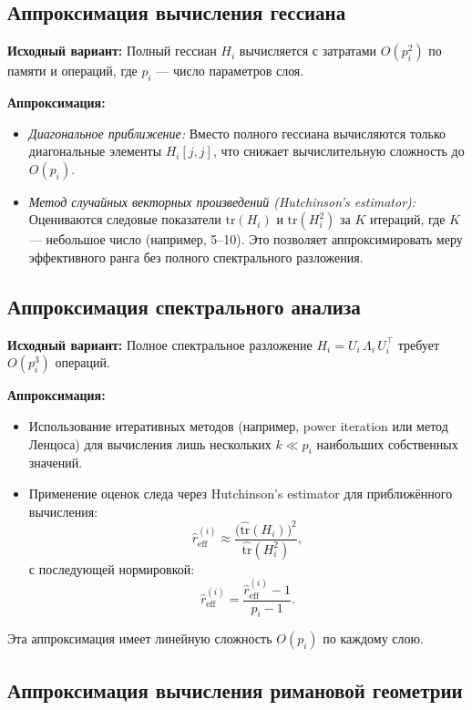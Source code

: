 \documentclass[a4paper,12pt]{article}
\begin{document}
\subsection*{Аппроксимация вычисления гессиана}

\textbf{Исходный вариант:} Полный гессиан \( H_i \) вычисляется с затратами \( O(p_i^2) \) по памяти и операций, где \( p_i \) --- число параметров слоя.

\textbf{Аппроксимация:}
\begin{itemize}
    \item \emph{Диагональное приближение:} Вместо полного гессиана вычисляются только диагональные элементы \( H_i[j,j] \), что снижает вычислительную сложность до \( O(p_i) \).
    \item \emph{Метод случайных векторных произведений (Hutchinson’s estimator):} Оцениваются следовые показатели \(\text{tr}(H_i)\) и \(\text{tr}(H_i^2)\) за \( K \) итераций, где \( K \) --- небольшое число (например, 5--10). Это позволяет аппроксимировать меру эффективного ранга без полного спектрального разложения.
\end{itemize}

\subsection*{Аппроксимация спектрального анализа}

\textbf{Исходный вариант:} Полное спектральное разложение \( H_i = U_i\,\Lambda_i\,U_i^\top \) требует \( O(p_i^3) \) операций.

\textbf{Аппроксимация:}
\begin{itemize}
    \item Использование итеративных методов (например, power iteration или метод Ленцоса) для вычисления лишь нескольких \( k \ll p_i \) наибольших собственных значений.
    \item Применение оценок следа через Hutchinson’s estimator для приближённого вычисления:
    \[
    \widehat{r}_{\text{eff}}^{(i)} \approx \frac{\Big(\widehat{\text{tr}}(H_i)\Big)^2}{\widehat{\text{tr}}(H_i^2)},
    \]
    с последующей нормировкой:
    \[
    \hat{r}_{\text{eff}}^{(i)} = \frac{\widehat{r}_{\text{eff}}^{(i)} - 1}{p_i - 1}.
    \]
\end{itemize}
Эта аппроксимация имеет линейную сложность \( O(p_i) \) по каждому слою.

\subsection*{Аппроксимация вычисления римановой геометрии}
\end{document}
